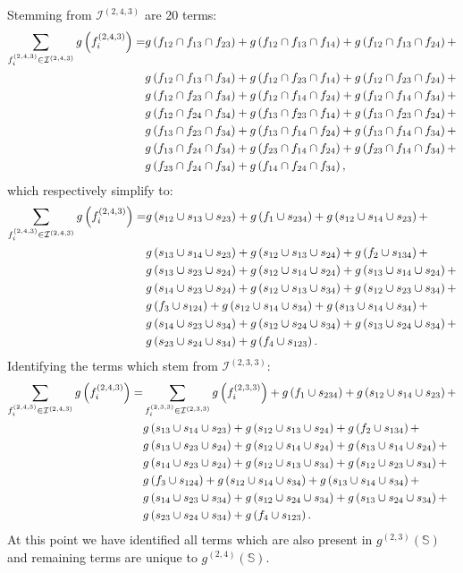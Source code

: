 \documentclass[11pt]{article}
\newcommand{\gxn}[1]{g\left(#1\right)}
\newcommand{\fn}[1]{f^{(#1)}}
\newcommand{\ints}[1]{\mathcal{I}^{(#1)}}
\newcommand{\sets}{\mathbb{S}}
\newcommand{\gapprox}[1]{g^{(#1)}\left(\sets\right)}
\begin{document}
Stemming from $\ints{2,4,3}$ are 20 terms:
\begin{align}
	\sum_{\fn{2,4,3}_i\in\ints{2,4,3}}\gxn{\fn{2,4,3}_i} =
	  & \gxn{\IDiDjDk} + \gxn{\IDiDjDl} + \gxn{\IDiDjDm} + \nonumber\\
	  & \gxn{\IDiDjDn} + \gxn{\IDiDkDl} + \gxn{\IDiDkDm} + \nonumber\\ 
	  & \gxn{\IDiDkDn} + \gxn{\IDiDlDm} + \gxn{\IDiDlDn} + \nonumber\\
	  & \gxn{\IDiDmDn} + \gxn{\IDjDkDl} + \gxn{\IDjDkDm} + \nonumber\\ 
	  & \gxn{\IDjDkDn} + \gxn{\IDjDlDm} + \gxn{\IDjDlDn} + \nonumber\\
	  & \gxn{\IDjDmDn} + \gxn{\IDkDlDm} + \gxn{\IDkDlDn} + \nonumber\\ 
	  & \gxn{\IDkDmDn} + \gxn{\IDlDmDn},
\end{align}
which respectively simplify to:
\begin{align}
	\sum_{\fn{2,4,3}_i\in\ints{2,4,3}}\gxn{\fn{2,4,3}_i} =
	& \gxn{\Ii\cup\Ij\cup\Ik} + \gxn{f_1\cup\Ill} + 
	  \gxn{\Ii\cup\Il\cup\Ik} + \nonumber\\
	& \gxn{\Ij\cup\Il\cup\Ik} + \gxn{\Ii\cup\Ij\cup\In} + 
	  \gxn{f_2\cup\Ikk} + \nonumber\\ 
	& \gxn{\Ij\cup\Ik\cup\In} + \gxn{\Ii\cup\Il\cup\In} +
	  \gxn{\Ij\cup\Il\cup\In} + \nonumber\\
	& \gxn{\Il\cup\Ik\cup\In} + \gxn{\Ii\cup\Ij\cup\Io} + 
	  \gxn{\Ii\cup\Ik\cup\Io} + \nonumber\\ 
	& \gxn{f_3\cup\Ijj} + \gxn{\Ii\cup\Il\cup\Io} + 
	  \gxn{\Ij\cup\Il\cup\Io} + \nonumber\\
	& \gxn{\Il\cup\Ik\cup\Io} + \gxn{\Ii\cup\In\cup\Io} + 
	  \gxn{\Ij\cup\In\cup\Io} +\nonumber\\ 
	& \gxn{\Ik\cup\In\cup\Io} + \gxn{f_4\cup\Iii}.
\end{align}
Identifying the terms which stem from $\ints{2,3,3}$:
\begin{align}
	\sum_{\fn{2,4,3}_i\in\ints{2,4,3}}\gxn{\fn{2,4,3}_i} =
	& \sum_{\fn{2,3,3}_i\in\ints{2,3,3}}\gxn{\fn{2,3,3}_i} + 
	  \gxn{f_1\cup\Ill} + \gxn{\Ii\cup\Il\cup\Ik} + \nonumber\\
	& \gxn{\Ij\cup\Il\cup\Ik} + \gxn{\Ii\cup\Ij\cup\In} + 
	\gxn{f_2\cup\Ikk} + \nonumber\\ 
	& \gxn{\Ij\cup\Ik\cup\In} + \gxn{\Ii\cup\Il\cup\In} +
	\gxn{\Ij\cup\Il\cup\In} + \nonumber\\
	& \gxn{\Il\cup\Ik\cup\In} + \gxn{\Ii\cup\Ij\cup\Io} + 
	\gxn{\Ii\cup\Ik\cup\Io} + \nonumber\\ 
	& \gxn{f_3\cup\Ijj} + \gxn{\Ii\cup\Il\cup\Io} + 
	\gxn{\Ij\cup\Il\cup\Io} + \nonumber\\
	& \gxn{\Il\cup\Ik\cup\Io} + \gxn{\Ii\cup\In\cup\Io} + 
	\gxn{\Ij\cup\In\cup\Io} +\nonumber\\ 
	& \gxn{\Ik\cup\In\cup\Io} + \gxn{f_4\cup\Iii}.
\end{align}
At this point we have identified all terms which are also present in 
$\gapprox{2,3}$ and remaining terms are unique to $\gapprox{2,4}$.
\end{document}

